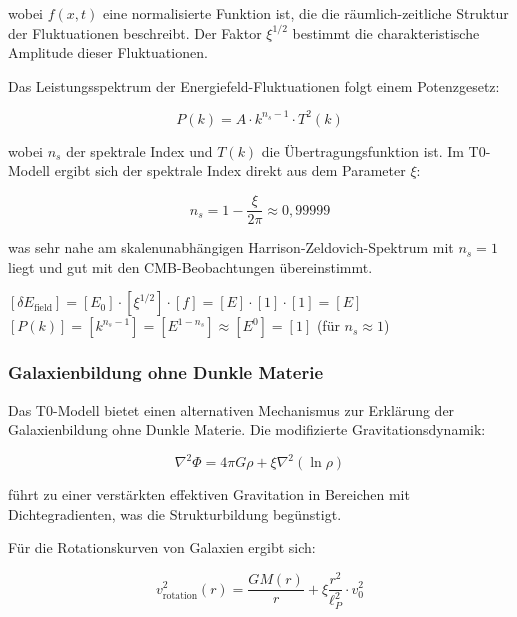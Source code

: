 \documentclass[12pt,a4paper]{article}
\theoremstyle{definition}
\begin{document}
wobei $f(x,t)$ eine normalisierte Funktion ist, die die räumlich-zeitliche Struktur der Fluktuationen beschreibt. Der Faktor $\xi^{1/2}$ bestimmt die charakteristische Amplitude dieser Fluktuationen.

Das Leistungsspektrum der Energiefeld-Fluktuationen folgt einem Potenzgesetz:

\begin{equation}
	P(k) = A \cdot k^{n_s - 1} \cdot T^2(k)
\end{equation}

wobei $n_s$ der spektrale Index und $T(k)$ die Übertragungsfunktion ist. Im T0-Modell ergibt sich der spektrale Index direkt aus dem Parameter $\xi$:

\begin{equation}
	n_s = 1 - \frac{\xi}{2\pi} \approx 0,99999
\end{equation}

was sehr nahe am skalenunabhängigen Harrison-Zeldovich-Spektrum mit $n_s = 1$ liegt und gut mit den CMB-Beobachtungen übereinstimmt.

\begin{einheitencheck}
	$[\delta E_{\text{field}}] = [E_0] \cdot [\xi^{1/2}] \cdot [f] = [E] \cdot [1] \cdot [1] = [E]$ \checkmark\\
	$[P(k)] = [k^{n_s-1}] = [E^{1-n_s}] \approx [E^{0}] = [1]$ (für $n_s \approx 1$) \checkmark
\end{einheitencheck}

\subsubsection{Galaxienbildung ohne Dunkle Materie}

Das T0-Modell bietet einen alternativen Mechanismus zur Erklärung der Galaxienbildung ohne Dunkle Materie. Die modifizierte Gravitationsdynamik:

\begin{equation}
	\nabla^2 \Phi = 4\pi G \rho + \xi \nabla^2 \left( \ln \rho \right)
\end{equation}

führt zu einer verstärkten effektiven Gravitation in Bereichen mit Dichtegradienten, was die Strukturbildung begünstigt.

Für die Rotationskurven von Galaxien ergibt sich:

\begin{equation}
	v_{\text{rotation}}^2(r) = \frac{GM(r)}{r} + \xi \frac{r^2}{\ell_P^2} \cdot v_0^2
\end{equation}
\end{document}
